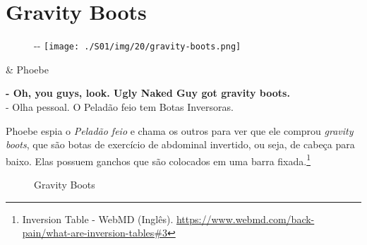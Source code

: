 \hypertarget{gravity-boots}{%
\section{Gravity Boots}\label{gravity-boots}}

\begin{figure}[!ht]
  \begin{adjustwidth}{-\oddsidemargin-1in}{-\rightmargin}
    \centering
    \texttt{[image: ./S01/img/20/gravity-boots.png]}
  \end{adjustwidth}
\end{figure}

\begin{tcolorbox}[enhanced,center upper,
    drop fuzzy shadow southeast, boxrule=0.3pt,
    lower separated=false, breakable,
    colframe=black!30!dialogoBorder,colback=white]
\begin{minipage}[c]{0.16\linewidth}
   & \centering \scriptsize{Phoebe}
\end{minipage}
\hfill
\begin{minipage}[c]{0.8\linewidth}
  \textbf{- Oh, you guys, look. Ugly Naked Guy got gravity boots.}\\
  - Olha pessoal. O Peladão feio tem Botas Inversoras.
\end{minipage}
\end{tcolorbox}

\saveparinfos
\noindent
\begin{minipage}[c]{0.5\textwidth}\useparinfo

Phoebe espia o \emph{Peladão feio} e chama os outros para ver que ele
comprou \emph{gravity boots}, que são botas de exercício de abdominal
invertido, ou seja, de cabeça para baixo. Elas possuem ganchos que são
colocados em uma barra fixada.\footnote{\sloppy Inversion Table - WebMD (Inglês). \url{https://www.webmd.com/back-pain/what-are-inversion-tables#3}}

\end{minipage}\hfill
\begin{minipage}[c]{0.5\textwidth}

\begin{figure}
  \centering
    \caption{Gravity Boots\label{fig:gravity-boots}}
\end{figure}

\end{minipage}


